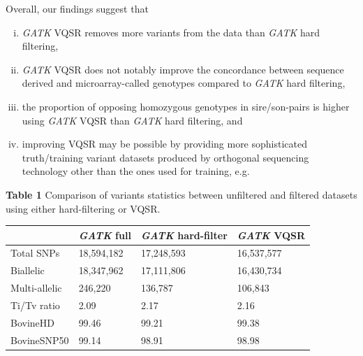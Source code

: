 \documentclass[../main.tex]{subfiles}
\begin{document}
\begin{flushleft}
Overall, our findings suggest that

\begin{enumerate}[(i)]
    \item \emph{GATK} VQSR removes more variants from the data than \emph{GATK} hard filtering,
    \item \emph{GATK} VQSR does not notably improve the concordance between sequence derived and microarray-called genotypes compared to \emph{GATK} hard filtering,
    \item the proportion of opposing homozygous genotypes in sire/son-pairs is higher using \emph{GATK} VQSR than \emph{GATK} hard filtering, and
    \item improving VQSR may be possible by providing more sophisticated truth/training variant datasets produced by orthogonal sequencing technology other than the ones used for training, e.g. \citep{li2018synthetic}
\end{enumerate}

\textbf{Table 1} Comparison of variants statistics between unfiltered and filtered datasets using
either hard-filtering or VQSR.


\bigskip

\begin{center}
\begin{tabular}{|l|l|l|l|} 
    \cline{2-4}
    \multicolumn{1}{l|}{~} & \textit{GATK} full & \textit{GATK }hard-filter & \textit{GATK} VQSR  \\ 
    \hline
    Total SNPs             & 18,594,182         & 17,248,593                & 16,537,577          \\ 
    \hline
    Biallelic              & 18,347,962         & 17,111,806                & 16,430,734          \\ 
    \hline
    Multi-allelic          & 246,220            & 136,787                   & 106,843             \\ 
    \hline
    Ti/Tv ratio            & 2.09               & 2.17                      & 2.16                \\ 
    \hline
    BovineHD               & 99.46              & 99.21                     & 99.38               \\ 
    \hline
    BovineSNP50            & 99.14              & 98.91                     & 98.98               \\
    \hline
    \end{tabular}
\end{center}


\end{flushleft}
\end{document}
